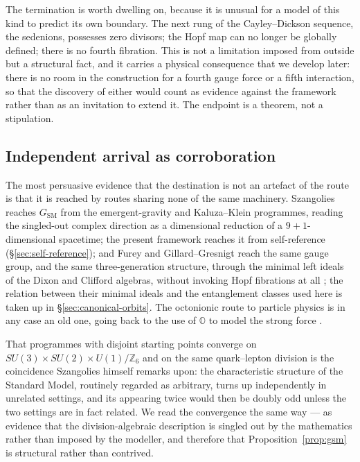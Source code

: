 The termination is worth dwelling on, because it is unusual for a model of this kind to predict
its own boundary. The next rung of the Cayley--Dickson sequence, the sedenions, possesses zero
divisors; the Hopf map can no longer be globally defined; there is no fourth fibration. This is
not a limitation imposed from outside but a structural fact, and it carries a physical
consequence that we develop later: there is no room in the construction for a fourth gauge force
or a fifth interaction, so that the discovery of either would count as evidence against the
framework rather than as an invitation to extend it. The endpoint is a theorem, not a
stipulation.

\subsection{Independent arrival as corroboration}

The most persuasive evidence that the destination is not an artefact of the route is that it is
reached by routes sharing none of the same machinery. Szangolies
\autocite{szangolies2025standardmodel} reaches $G_{\mathrm{SM}}$ from the emergent-gravity and
Kaluza--Klein programmes, reading the singled-out complex direction as a dimensional reduction
of a $9+1$-dimensional spacetime; the present framework reaches it from self-reference
(\S\ref{sec:self-reference}); and Furey and Gillard--Gresnigt reach the same gauge group, and
the same three-generation structure, through the minimal left ideals of the Dixon and Clifford
algebras, without invoking Hopf fibrations at all
\autocite{furey2018three,gillardgresnigt2019three}; the relation between their minimal ideals
and the entanglement classes used here is taken up in \S\ref{sec:canonical-orbits}. The
octonionic route to particle physics is in any case an old one, going back to the use of
$\mathbb{O}$ to model the strong force \autocite{gunaydingursey1974quark}.

That programmes with disjoint starting points converge on
$SU(3) \times SU(2) \times U(1)/\mathbb{Z}_6$ and on the same quark--lepton division is the
coincidence Szangolies himself remarks upon: the characteristic structure of the Standard Model,
routinely regarded as arbitrary, turns up independently in unrelated settings, and its appearing
twice would then be doubly odd unless the two settings are in fact related. We read the
convergence the same way --- as evidence that the division-algebraic description is singled out
by the mathematics rather than imposed by the modeller, and therefore that
Proposition~\ref{prop:gsm} is structural rather than contrived.

